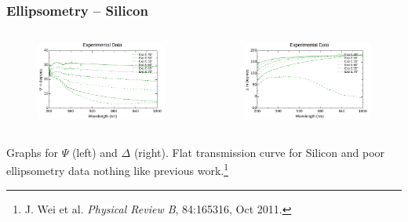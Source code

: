 \documentclass{beamer}
\begin{document}
\begin{frame}
\frametitle{Ellipsometry -- Silicon}
\begin{columns}
\begin{figure}
\includegraphics[width=\textwidth]{si_ellipsometry_1}
\end{figure}
\begin{figure}
\includegraphics[width=\textwidth]{si_ellipsometry_2}
\end{figure}
\end{columns}
\begin{center}
Graphs for $\Psi$ (left) and $\Delta$ (right). Flat transmission curve for Silicon and poor ellipsometry data nothing like previous work.\footnote{J. Wei et al. \emph{Physical Review B}, 84:165316, Oct 2011.}
\end{center}
\end{frame}
\end{document}
